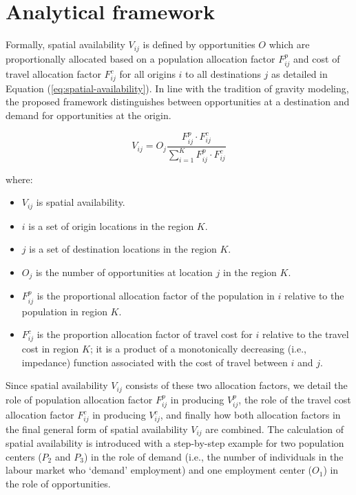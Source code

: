 \documentclass[]{elsarticle} %
\providecommand{\tightlist}{%
  \setlength{\itemsep}{0pt}\setlength{\parskip}{0pt}}
\begin{document}
\hypertarget{analytical-framework}{%
\section{Analytical framework}\label{analytical-framework}}

Formally, spatial availability \(V_{ij}\) is defined by opportunities
\(O\) which are proportionally allocated based on a population
allocation factor \(F^p_{ij}\) and cost of travel allocation factor
\(F^c_{ij}\) for all origins \(i\) to all destinations \(j\) as detailed
in Equation (\ref{eq:spatial-availability}). In line with the tradition
of gravity modeling, the proposed framework distinguishes between
opportunities at a destination and demand for opportunities at the
origin.

\begin{equation}
\label{eq:spatial-availability}
V_{ij} = O_j\frac{F^p_{ij} \cdot F^c_{ij}}{\sum_{i=1}^K F^p_{ij} \cdot F^c_{ij}}
\end{equation}

\noindent where:

\begin{itemize}
\tightlist
\item
  \(V_{ij}\) is spatial availability.
\item
  \(i\) is a set of origin locations in the region \(K\).
\item
  \(j\) is a set of destination locations in the region \(K\).
\item
  \(O_j\) is the number of opportunities at location \(j\) in the region
  \(K\).
\item
  \(F^p_{ij}\) is the proportional allocation factor of the population
  in \(i\) relative to the population in region \(K\).
\item
  \(F^c_{ij}\) is the proportion allocation factor of travel cost for
  \(i\) relative to the travel cost in region \(K\); it is a product of
  a monotonically decreasing (i.e., impedance) function associated with
  the cost of travel between \(i\) and \(j\).
\end{itemize}

Since spatial availability \(V_{ij}\) consists of these two allocation
factors, we detail the role of population allocation factor \(F^p_{ij}\)
in producing \(V^p_{ij}\), the role of the travel cost allocation factor
\(F^c_{ij}\) in producing \(V^c_{ij}\), and finally how both allocation
factors in the final general form of spatial availability \(V_{ij}\) are
combined. The calculation of spatial availability is introduced with a
step-by-step example for two population centers (\(P_2\) and \(P_3\)) in
the role of demand (i.e., the number of individuals in the labour market
who `demand' employment) and one employment center (\(O_1\)) in the role
of opportunities.
\end{document}
